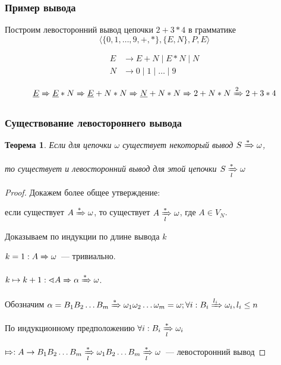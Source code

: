 \documentclass{beamer}
\newtheorem{rutheorem}{Теорема}
\newcommand{\derives}[1][*]{\xRightarrow[]{#1}}
\begin{document}
\begin{frame}[fragile]
  \transwipe[direction=90]
  \frametitle{Пример вывода}
  Построим левосторонний вывод цепочки $2+3*4$ в грамматике \[\langle \{ 0, 1, \dots, 9, +, *\}, \{E, N\}, P, E \rangle\]
  
\begin{align*}
  E &\to E + N \mid E * N \mid N \\ 
  N &\to 0 \mid 1  \mid \dots \mid 9
\end{align*}

\[ \underline{E} \derives[]  \underline{E} * N \derives[] \underline{E} + N * N \derives[] \underline{N} + N * N \derives[] 2 + N * N \derives[2] 2 + 3 * 4\]
\end{frame}

\begin{frame}[fragile]
  \transwipe[direction=90]
  \frametitle{Существование левостороннего вывода}
  \begin{rutheorem}
    Если для цепочки $\omega$ существует некоторый вывод $S \derives \omega$, 
    
    то существует и левосторонний вывод для этой цепочки $S \xRightarrow[l]{*} \omega$
  \end{rutheorem}
  \begin{proof}
  Докажем более общее утверждение: 
  
  если существует $A \derives \omega$, то существует $A \xRightarrow[l]{*} \omega$, где $A \in V_N$. 
  
  Доказываем по индукции по длине вывода $k$
  
    $k = 1: A \derives[] \omega$~--- тривиально. 
    
  $k \mapsto k + 1: \sphericalangle A \derives[] \alpha \derives \omega$. 
  
  Обозначим $ \alpha = B_1 B_2 \dots B_m \derives \omega_1 \omega_2 \dots \omega_m = \omega; \forall i: B_i \xRightarrow[]{l_i} \omega_i, l_i \leq n$
  
  По индукционному предположению $\forall i: B_i \xRightarrow[l]{*} \omega_i$
  
  $\Mapsto: A \to B_1 B_2 \dots B_m \xRightarrow[l]{*} \omega_1  B_2 \dots B_m \xRightarrow[l]{*} \omega$~--- левосторонний вывод
  \end{proof}
\end{frame}
\end{document}
